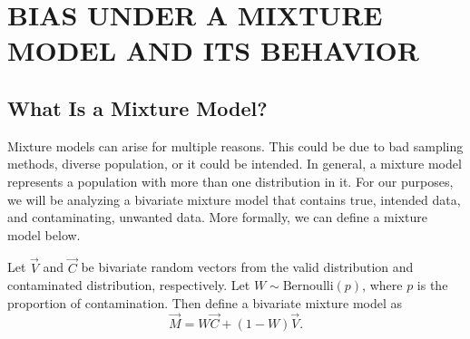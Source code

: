 \chapter{BIAS UNDER A MIXTURE MODEL AND ITS BEHAVIOR}\label{chap:bias_mixture}
\section{What Is a Mixture Model?}\label{sec:mixture_model}
\hspace{24pt} Mixture models can arise for multiple reasons. This could be due to bad sampling methods, diverse population, or it could be intended. In general, a mixture model represents a population with more than one distribution in it. For our purposes, we will be analyzing a bivariate mixture model that contains true, intended data, and contaminating, unwanted data. More formally, we can define a mixture model below.
\begin{definition}\label{def:mixture}
    Let $\vec{V}$ and $\vec{C}$ be bivariate random vectors from the valid distribution and contaminated distribution, respectively. Let $W\sim\text{Bernoulli}(p)$, where $p$ is the proportion of contamination. Then define a bivariate mixture model as $$\vec{M}=W\vec{C}+\left(1-W\right)\vec{V}.$$
\end{definition}
